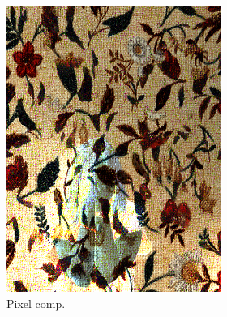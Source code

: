 \begin{figure}[]
\begin{subfigure}{\textwidth}
\begin{subfigure}{0.24\textwidth}
            \includegraphics[width=\textwidth]{images/04-experiment02/human/flowers2/pixel_im.jpg}
            \caption*{Pixel comp.}
        \end{subfigure}
        \hfill
        \begin{subfigure}{0.24\textwidth}
            \centering

\end{subfigure}
\end{subfigure}
\end{figure}
